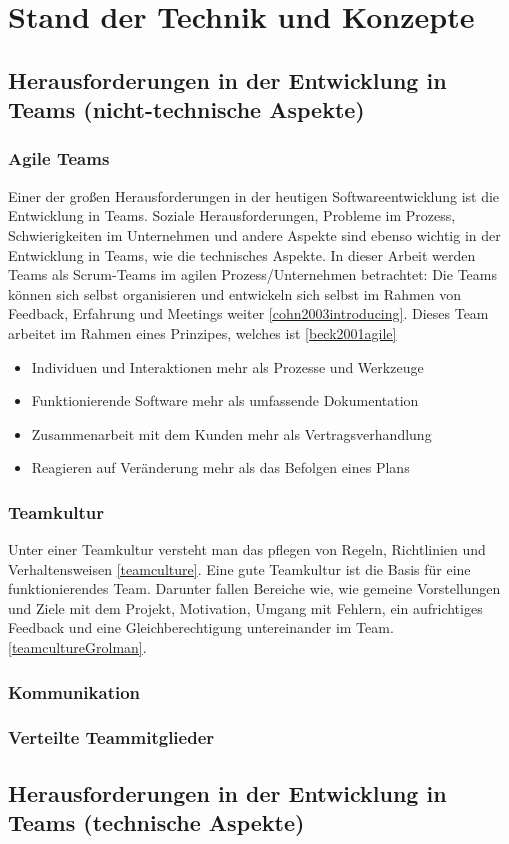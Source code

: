 \chapter{Stand der Technik und Konzepte}
\chapterstart

\label{chap:related}
\section{Herausforderungen in der Entwicklung in Teams (nicht-technische Aspekte)}
\subsection{Agile Teams}
Einer der großen Herausforderungen in der heutigen Softwareentwicklung ist die Entwicklung in Teams. Soziale Herausforderungen, Probleme im Prozess, Schwierigkeiten im Unternehmen und andere Aspekte sind ebenso wichtig in der Entwicklung in Teams, wie die technisches Aspekte. In dieser Arbeit werden Teams als Scrum-Teams im agilen Prozess/Unternehmen betrachtet: Die Teams können sich selbst organisieren und entwickeln sich selbst im Rahmen von Feedback, Erfahrung und Meetings weiter \ref{cohn2003introducing}. Dieses Team arbeitet im Rahmen eines Prinzipes, welches ist \ref{beck2001agile}
\begin{itemize} 
\item Individuen und Interaktionen mehr als Prozesse und Werkzeuge
\item Funktionierende Software mehr als umfassende Dokumentation
\item Zusammenarbeit mit dem Kunden mehr als Vertragsverhandlung
\item Reagieren auf Veränderung mehr als das Befolgen eines Plans
\end{itemize}
\subsection{Teamkultur}
Unter einer Teamkultur versteht man das pflegen von Regeln, Richtlinien und Verhaltensweisen \ref{teamculture}. Eine gute Teamkultur ist die Basis für eine funktionierendes Team. Darunter fallen Bereiche wie, wie gemeine Vorstellungen und Ziele mit dem Projekt, Motivation, Umgang mit Fehlern, ein aufrichtiges Feedback und eine Gleichberechtigung untereinander im Team. \ref{teamcultureGrolman}. 
\subsection{Kommunikation}
\subsection{Verteilte Teammitglieder}
\section{Herausforderungen in der Entwicklung in Teams (technische Aspekte)}

\chapterend